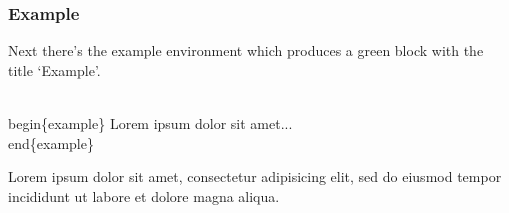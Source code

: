 \label{example}
\begin{frame}\frametitle{Example}
  Next there’s the example environment which produces a green block with the title ‘Example’.
  \begin{semiverbatim}
    \\begin\{example\}\newline
    Lorem ipsum dolor sit amet...\newline
    \\end\{example\}
  \end{semiverbatim}
  \begin{example}
    Lorem ipsum dolor sit amet, consectetur adipisicing elit, sed do eiusmod tempor incididunt ut labore et dolore magna aliqua.
  \end{example} 
\end{frame}